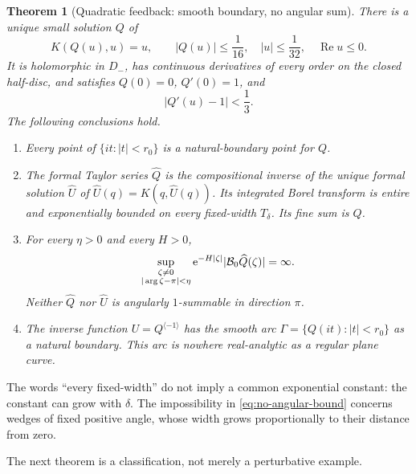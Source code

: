 \documentclass[11pt,a4paper]{article}
\numberwithin{equation}{section}
\newtheorem{theorem}{Theorem}[section]
\theoremstyle{definition}
\theoremstyle{remark}
\newcommand{\ee}{\mathrm e}
\newcommand{\Ree}{\operatorname{Re}}
\newcommand{\B}{\mathcal B_0}
\newcommand{\U}{\widehat U}
\newcommand{\Q}{\widehat Q}
\newcommand{\inv}{\langle-1\rangle}
\begin{document}
\begin{theorem}[Quadratic feedback: smooth boundary, no angular sum]
\label{thm:main}
There is a unique small solution $Q$ of
\begin{equation}
 K(Q(u),u)=u,
 \qquad |Q(u)|\le\frac1{16},\quad
 |u|\le\frac1{32},\quad \Ree u\le0.
 \label{eq:inverse-equation}
\end{equation}
It is holomorphic in $D_-$, has continuous derivatives of every order on
the closed half-disc, and satisfies $Q(0)=0$, $Q'(0)=1$, and
\begin{equation}
 |Q'(u)-1|<\frac13.
 \label{eq:Qprime}
\end{equation}
The following conclusions hold.
\begin{enumerate}[label=\textup{(\roman*)}]
\item Every point of $\{it:|t|<r_0\}$ is a natural-boundary point for $Q$.
\item The formal Taylor series $\Q$ is the compositional inverse of the
unique formal solution $\U$ of
$\U(q)=K(q,\U(q))$.
Its integrated Borel transform is entire and exponentially bounded on
\emph{every} fixed-width $T_\delta$.  Its fine sum is $Q$.
\item For every $\eta>0$ and every $H>0$,
\begin{equation}
 \sup_{\substack{\zeta\ne0\cr |\arg\zeta-\pi|<\eta}}
       \ee^{-H|\zeta|}|\B\Q(\zeta)|=\infty.
 \label{eq:no-angular-bound}
\end{equation}
Neither $\Q$ nor $\U$ is angularly $1$-summable in direction $\pi$.
\item The inverse function $U=Q^{\inv}$ has the smooth arc
$\Gamma=\{Q(it):|t|<r_0\}$ as a natural boundary.  This arc is nowhere
real-analytic as a regular plane curve.
\end{enumerate}
\end{theorem}

The words ``every fixed-width'' do not imply a common exponential constant:
the constant can grow with $\delta$.  The impossibility in
\eqref{eq:no-angular-bound} concerns wedges of fixed positive angle,
whose width grows proportionally to their distance from zero.

The next theorem is a classification, not merely a perturbative example.
\end{document}

